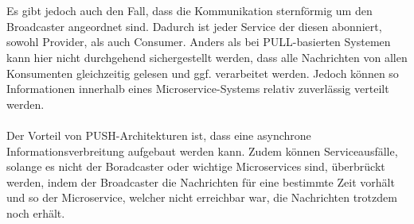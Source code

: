 \\\\
Es gibt jedoch auch den Fall, dass die Kommunikation sternförmig um den Broadcaster angeordnet sind. Dadurch ist jeder Service der diesen abonniert, sowohl Provider, als auch Consumer. Anders als bei PULL-basierten Systemen kann hier nicht durchgehend sichergestellt werden, dass alle Nachrichten von allen Konsumenten gleichzeitig gelesen und ggf. verarbeitet werden. Jedoch können so Informationen innerhalb eines Microservice-Systems relativ zuverlässig verteilt werden.
\\\\
Der Vorteil von PUSH-Architekturen ist, dass eine asynchrone Informationsverbreitung aufgebaut werden kann. Zudem können Serviceausfälle, solange es nicht der Boradcaster oder wichtige Microservices sind, überbrückt werden, indem der Broadcaster die Nachrichten für eine bestimmte Zeit vorhält und so der Microservice, welcher nicht erreichbar war, die Nachrichten trotzdem noch erhält.